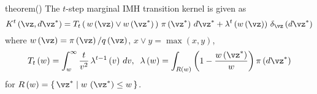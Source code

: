 
\begin{theoremEnd}{theorem}\label{thm:imh_exact_kernel}(\citealt[Theorem 1]{Smith96exacttransition})
  The \(t\)-step marginal IMH transition kernel is given as
  {\small
    \[
    K^t\left(\vz, d\vz^*\right) 
    = T_t\left(\, w\left(\vz\right) \vee w\left(\vz^*\right)\,\right) \, \pi\left(\vz^*\right) \, d\vz^*
    + \lambda^t\left(w\left(\vz\right)\right) \, \delta_{\vz}\left(d\vz^*\right)
    \]
  }%
  where {\(w\left(\vz\right) = \pi\left(\vz\right)/q\left(\vz\right)\), \(x \vee y = \max\left(x, y\right)\)},
  {\small%
  \begin{align*}
  T_t\left(w\right)      = \int_w^{\infty} \frac{t}{v^2} \, \lambda^{t-1}\left(v\right)\,dv,\;\;
  \lambda\left(w\right) = \int_{R\left(w\right)} \left( 1 - \frac{w\left(\vz^*\right)}{w}  \right) \pi\left(d\vz^*\right)
  \end{align*}
  }
  for {\(R\left(w\right) = \{\, \vz^* \mid w\,\left(\vz^*\right) \leq w \,\}\)}.
\end{theoremEnd}

